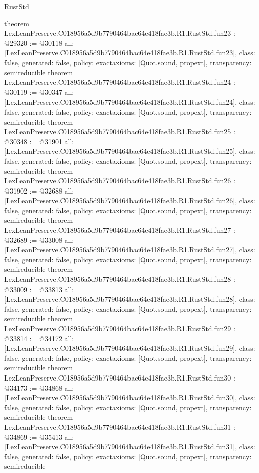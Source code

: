 \begin{lexlean}{RustStd}
\begin{coremodule}
{}
theorem LexLeanPreserve.C018956a5d9b7790464bac64e418fae3b.R1.RustStd.fun23 : @29320 := @30118 {
  all: [LexLeanPreserve.C018956a5d9b7790464bac64e418fae3b.R1.RustStd.fun23],
  class: false,
  generated: false,
  policy: exact{axioms: [Quot.sound, propext]},
  transparency: semireducible
}
theorem LexLeanPreserve.C018956a5d9b7790464bac64e418fae3b.R1.RustStd.fun24 : @30119 := @30347 {
  all: [LexLeanPreserve.C018956a5d9b7790464bac64e418fae3b.R1.RustStd.fun24],
  class: false,
  generated: false,
  policy: exact{axioms: [Quot.sound, propext]},
  transparency: semireducible
}
theorem LexLeanPreserve.C018956a5d9b7790464bac64e418fae3b.R1.RustStd.fun25 : @30348 := @31901 {
  all: [LexLeanPreserve.C018956a5d9b7790464bac64e418fae3b.R1.RustStd.fun25],
  class: false,
  generated: false,
  policy: exact{axioms: [Quot.sound, propext]},
  transparency: semireducible
}
theorem LexLeanPreserve.C018956a5d9b7790464bac64e418fae3b.R1.RustStd.fun26 : @31902 := @32688 {
  all: [LexLeanPreserve.C018956a5d9b7790464bac64e418fae3b.R1.RustStd.fun26],
  class: false,
  generated: false,
  policy: exact{axioms: [Quot.sound, propext]},
  transparency: semireducible
}
theorem LexLeanPreserve.C018956a5d9b7790464bac64e418fae3b.R1.RustStd.fun27 : @32689 := @33008 {
  all: [LexLeanPreserve.C018956a5d9b7790464bac64e418fae3b.R1.RustStd.fun27],
  class: false,
  generated: false,
  policy: exact{axioms: [Quot.sound, propext]},
  transparency: semireducible
}
theorem LexLeanPreserve.C018956a5d9b7790464bac64e418fae3b.R1.RustStd.fun28 : @33009 := @33813 {
  all: [LexLeanPreserve.C018956a5d9b7790464bac64e418fae3b.R1.RustStd.fun28],
  class: false,
  generated: false,
  policy: exact{axioms: [Quot.sound, propext]},
  transparency: semireducible
}
theorem LexLeanPreserve.C018956a5d9b7790464bac64e418fae3b.R1.RustStd.fun29 : @33814 := @34172 {
  all: [LexLeanPreserve.C018956a5d9b7790464bac64e418fae3b.R1.RustStd.fun29],
  class: false,
  generated: false,
  policy: exact{axioms: [Quot.sound, propext]},
  transparency: semireducible
}
theorem LexLeanPreserve.C018956a5d9b7790464bac64e418fae3b.R1.RustStd.fun30 : @34173 := @34868 {
  all: [LexLeanPreserve.C018956a5d9b7790464bac64e418fae3b.R1.RustStd.fun30],
  class: false,
  generated: false,
  policy: exact{axioms: [Quot.sound, propext]},
  transparency: semireducible
}
theorem LexLeanPreserve.C018956a5d9b7790464bac64e418fae3b.R1.RustStd.fun31 : @34869 := @35413 {
  all: [LexLeanPreserve.C018956a5d9b7790464bac64e418fae3b.R1.RustStd.fun31],
  class: false,
  generated: false,
  policy: exact{axioms: [Quot.sound, propext]},
  transparency: semireducible
}
\end{coremodule}
\end{lexlean}
